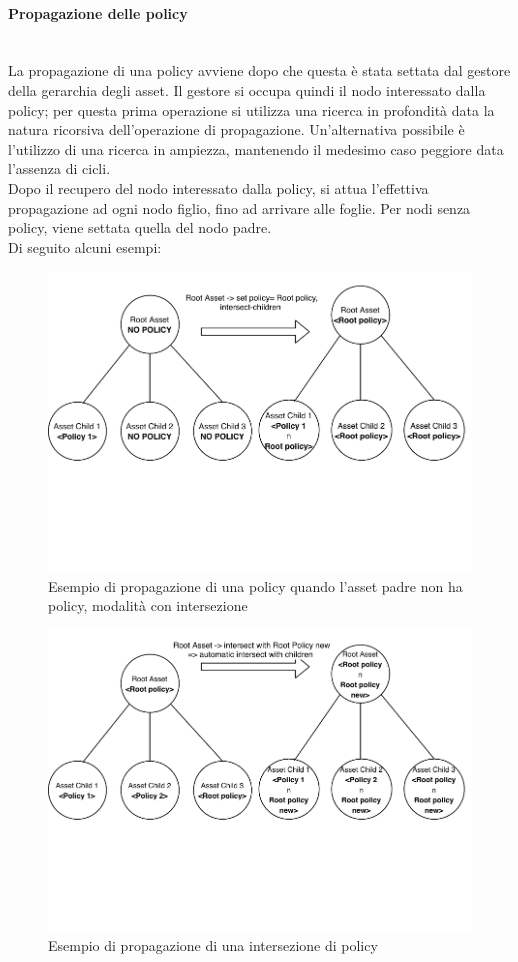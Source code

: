 \documentclass[12pt,a4paper,twoside]{book}
\begin{document}
\paragraph{Propagazione delle policy}\label{propagation}\mbox{}\\
La propagazione di una policy avviene dopo che questa è stata settata dal gestore della gerarchia degli asset. Il gestore si occupa quindi il nodo interessato dalla policy; per questa prima operazione si utilizza una ricerca in profondità data la natura ricorsiva dell'operazione di propagazione. Un'alternativa possibile è l'utilizzo di una ricerca in ampiezza, mantenendo il medesimo caso peggiore data l'assenza di cicli.\\
Dopo il recupero del nodo interessato dalla policy, si attua l'effettiva propagazione ad ogni nodo figlio, fino ad arrivare alle foglie. Per nodi senza policy, viene settata quella del nodo padre.\\
Di seguito alcuni esempi:
\begin{figure}[H]
\centering
\includegraphics[scale=.65]{../immagini/assetSetPropagation.pdf}
\caption{Esempio di propagazione di una policy quando l'asset padre non ha policy, modalità con intersezione}
\label{imgAssetPropSet}
\end{figure}
\begin{figure}[H]
\centering
\includegraphics[scale=.65]{../immagini/assetIntersectPropagation.pdf}
\caption{Esempio di propagazione di una intersezione di policy}
\label{imgAssetPropIntersect}
\end{figure}
\end{document}
